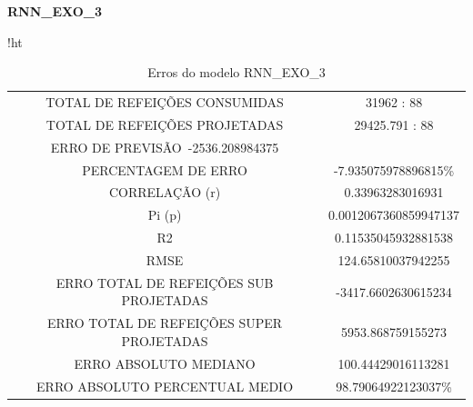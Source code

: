 \documentclass[	12pt, Times, openright, twoside, a4paper, english, brazil]{abntex2}
\begin{document}
                
              \textbf{RNN\_EXO\_3}
                \begin{figure}[H]
                \end{figure}

                \begin{figure}[H]
                \end{figure}
                
                 \begin{table}{!ht}
                \centering
                \caption{Erros do modelo  RNN\_EXO\_3 }
                    \begin{tabular}{|c|c|}
                    \rowcolor{gray!50}
                    \hline
               \multicolumn{2}{c}{ RNN\_EXO\_3:} \\ \hline
                TOTAL DE REFEIÇÕES CONSUMIDAS & 31962 : 88 \\
                TOTAL DE REFEIÇÕES PROJETADAS  & 29425.791 : 88 \\
                ERRO DE PREVISÃO\ -2536.208984375\\ 
                PERCENTAGEM DE ERRO &-7.935075978896815\% \\
                CORRELAÇÃO (r) & 0.33963283016931 \\ Pi (p)& 0.0012067360859947137 \\R2 & 0.11535045932881538\\
                RMSE & 124.65810037942255\\
                ERRO TOTAL DE REFEIÇÕES SUB PROJETADAS & -3417.6602630615234\\
                ERRO TOTAL DE REFEIÇÕES SUPER PROJETADAS & 5953.868759155273\\
                ERRO ABSOLUTO MEDIANO & 100.44429016113281\\
                ERRO ABSOLUTO PERCENTUAL MEDIO & 98.79064922123037\% \\ \hline \end{tabular} \end{table}
\end{document}
